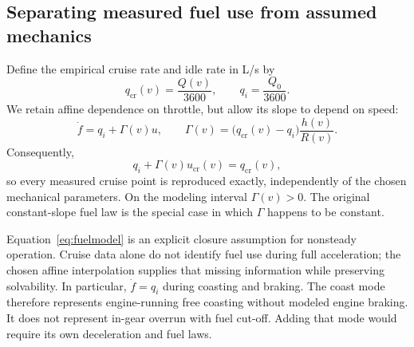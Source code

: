 \documentclass[10pt,a4paper]{article}
\newcommand{\cruise}{\mathrm{cr}}
\begin{document}
\subsection{Separating measured fuel use from assumed mechanics}
Define the empirical cruise rate and idle rate in L/s by
\begin{equation}
q_{\cruise}(v)=\frac{Q(v)}{3600},\qquad q_i=\frac{Q_0}{3600}.
\end{equation}
We retain affine dependence on throttle, but allow its slope to depend on speed:
\begin{equation}
\boxed{\dot f=q_i+\Gamma(v)u,
\qquad
\Gamma(v)=\bigl(q_{\cruise}(v)-q_i\bigr)\frac{h(v)}{R(v)}.}
\label{eq:fuelmodel}
\end{equation}
Consequently,
\begin{equation}
q_i+\Gamma(v)u_{\cruise}(v)=q_{\cruise}(v),
\end{equation}
so every measured cruise point is reproduced exactly, independently of the chosen mechanical parameters. On the modeling interval $\Gamma(v)>0$. The original constant-slope fuel law is the special case in which $\Gamma$ happens to be constant.

Equation~\eqref{eq:fuelmodel} is an explicit closure assumption for nonsteady operation. Cruise data alone do not identify fuel use during full acceleration; the chosen affine interpolation supplies that missing information while preserving solvability. In particular, $\dot f=q_i$ during coasting and braking. The coast mode therefore represents engine-running free coasting without modeled engine braking. It does not represent in-gear overrun with fuel cut-off. Adding that mode would require its own deceleration and fuel laws.
\end{document}

